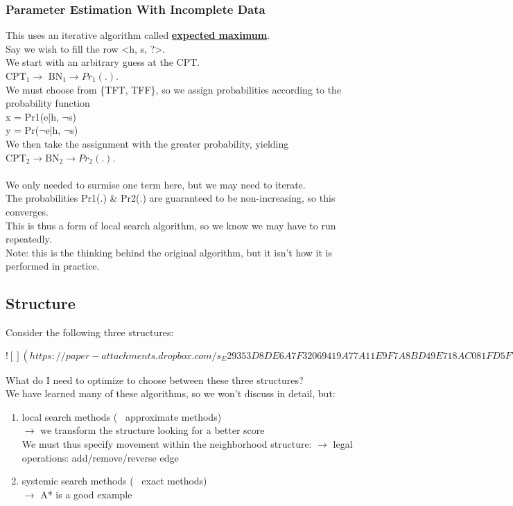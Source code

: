 \documentclass[../../lecture_notes.tex]{subfiles}
\begin{document}
\subsubsection*{Parameter Estimation With Incomplete Data}
\noindent This uses an iterative algorithm called \textbf{\underline{expected maximum}}.\\
Say we wish to fill the row <h, s, ?>.\\
We start with an arbitrary guess at the CPT.\\
	\indent $\text{CPT}_1 \rightarrow \text{ BN}_1 \rightarrow Pr_1(.)$.\\
We must choose from \{TFT, TFF\}, so we assign probabilities according to the probability function\\
	\indent x = Pr1(e|h, $\neg$s)\\
	\indent y = Pr($\neg$e|h, $\neg$s)\\
We then take the assignment with the greater probability, yielding\\
	\indent $\text{CPT}_2 \rightarrow \text{BN}_2 \rightarrow Pr_2(.)$.\\
\\
We only needed to surmise one term here, but we may need to iterate.\\
The probabilities Pr1(.) \& Pr2(.) are guaranteed to be non-increasing, so this converges.\\
This is thus a form of local search algorithm, so we know we may have to run repeatedly.\\
Note: this is the thinking behind the original algorithm, but it isn’t how it is performed in practice.\\

\subsection*{Structure}
\noindent Consider the following three structures:

\newpage 
$![](https://paper-attachments.dropbox.com/s_E29353D8DE6A7F32069419A77A11E9F7A8BD49E718AC081FD5F77701FB86FF68_1590908603345_Untitled+drawing+4.jpg)$
\newpage

\noindent What do I need to optimize to choose between these three structures?\\
We have learned many of these algorithms, so we won’t discuss in detail, but:
	\begin{enumerate} [itemsep=0mm]
		\item local search methods (~ approximate methods)\\
				$\rightarrow$ we transform the structure looking for a better score\\
			We must thus specify movement within the neighborhood structure:
				$\rightarrow$ legal operations: add/remove/reverse edge
		\item systemic search methods (~ exact methods)\\
			$\rightarrow$ A* is a good example
	\end{enumerate} \medskip
\end{document}
